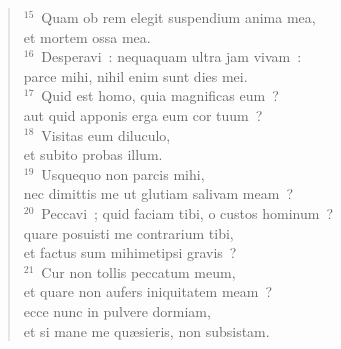 \begin{flushleft}
\begin{verse}
${}^{15}$~Quam ob rem elegit suspendium anima mea,\\ et mortem ossa mea.\\
${}^{16}$~Desperavi~: nequaquam ultra jam vivam~:\\ parce mihi, nihil enim sunt dies mei.\\
${}^{17}$~Quid est homo, quia magnificas eum~?\\ aut quid apponis erga eum cor tuum~?\\
${}^{18}$~Visitas eum diluculo,\\ et subito probas illum.\\
${}^{19}$~Usquequo non parcis mihi,\\ nec dimittis me ut glutiam salivam meam~?\\
${}^{20}$~Peccavi~; quid faciam tibi, o custos hominum~?\\ quare posuisti me contrarium tibi,\\ et factus sum mihimetipsi gravis~?\\
${}^{21}$~Cur non tollis peccatum meum,\\ et quare non aufers iniquitatem meam~?\\ ecce nunc in pulvere dormiam,\\ et si mane me qu\ae sieris, non subsistam.\end{verse}\end{flushleft}


